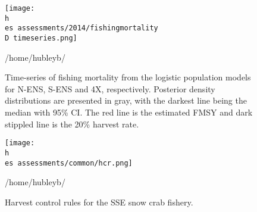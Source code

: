 \documentclass[11pt]{article}
\newcommand{\D}{.}
\newcommand{\h}{/home/hubleyb/}
\newcommand{\es}{bio.data/bio.snowcrab/}
\begin{document}
\begin{figure}
\centering
\texttt{[image: \\h \\es assessments/2014/fishingmortality\\D timeseries.png]}\\
\caption{Time-series of fishing mortality from the logistic population models for N-ENS, S-ENS and 4X, respectively. Posterior density distributions are presented in gray, with the darkest line being the median with 95\% CI. The red line is the estimated FMSY and dark stippled line is the 20\% harvest rate.}
\h \end{figure}
\clearpage
%
%

\begin{figure}
\centering
\texttt{[image: \\h \\es assessments/common/hcr.png]}\\ 
\caption{Harvest control rules for the SSE snow crab fishery.}
\h \end{figure}
\clearpage
\end{document}
